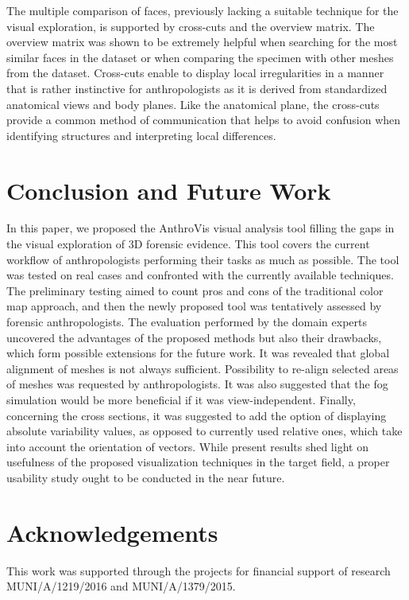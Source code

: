 \documentclass[final,5p,times]{elsarticle}
\begin{document}
The multiple comparison of faces, previously lacking a suitable technique for the visual exploration, is supported by cross-cuts and the overview matrix. 
The overview matrix was shown to be extremely helpful when searching for the most similar faces in the dataset or when comparing the specimen with other meshes from the dataset. 
Cross-cuts enable to display local irregularities in a manner that is rather instinctive for anthropologists as it is derived from standardized anatomical views and body planes. 
Like the anatomical plane, the cross-cuts provide a common method of communication that helps to avoid confusion when identifying structures and interpreting local differences.

\section{Conclusion and Future Work} \label{conclusion}
In this paper, we proposed the AnthroVis visual analysis tool filling the gaps in the visual exploration of 3D forensic evidence.
This tool covers the current workflow of anthropologists performing their tasks as much as possible.
The tool was tested on real cases and confronted with the currently available techniques. 
The preliminary testing aimed to count pros and cons of the traditional color map approach, and then the newly proposed tool was tentatively assessed by forensic anthropologists. 
The evaluation performed by the domain experts uncovered the advantages of the proposed methods but also their drawbacks, which form possible extensions for the future work. 
It was revealed that global alignment of meshes is not always sufficient.
Possibility to re-align selected areas of meshes was requested by anthropologists.
It was also suggested that the fog simulation would be more beneficial if it was view-independent. 
Finally, concerning the cross sections, it was suggested to add the option of displaying absolute variability values, as opposed to currently used relative ones, which take into account the orientation of vectors.
While present results shed light on usefulness of the proposed visualization techniques in the target field, a proper usability study ought to be conducted in the near future. 

\section{Acknowledgements}
\label{ackno}
\begin{sloppypar}
This work was supported through the projects for financial support of research MUNI/A/1219/2016 and MUNI/A/1379/2015.
\end{sloppypar}
\end{document}
